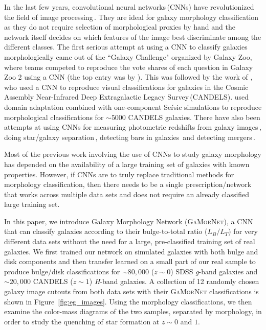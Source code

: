 \documentclass[twocolumn]{aastex63}
\newcommand\gamornet{G\textsc{a}M\textsc{or}N\textsc{et}}
\begin{document}
In the last few years, convolutional neural networks\,(CNNs) have revolutionized the field of image processing\,\citep{dl_1,dl_2}. They are ideal for galaxy morphology classification as they do not require selection of morphological proxies by hand and the network itself decides on which features of the image best discriminate among the different classes. The first serious attempt at using a CNN to classify galaxies morphologically came out of the ``Galaxy Challenge" organized by Galaxy Zoo, where teams competed to reproduce the vote shares of each question in Galaxy Zoo 2 using a CNN (the top entry was by \citealp{dieleman_15}). This was followed by the work of \citet{company_15}, who used a CNN to reproduce visual classifications for galaxies in the Cosmic Assembly Near-Infrared Deep Extragalactic Legacy Survey\,(CANDELS). \citet{tuccillo_18} used domain adaptation combined with one-component Se\'rsic simulations to reproduce morphological classifications for $\sim 5000$ CANDELS galaxies. There have also been attempts at using CNNs for measuring photometric redshifts from galaxy images\,\citep{ml_pz}, doing star/galaxy separation\,\citep{ml_sz}, detecting bars in galaxies\,\citep{ml_bars} and detecting mergers\,\citep{ml_mergers}. 

Most of the previous work involving the use of CNNs to study galaxy morphology has depended on the availability of a large training set of galaxies with known properties. However, if CNNs are to truly replace traditional methods for morphology classification, then there needs to be a single prescription/network that works across multiple data sets and does not require an already classified large training set. 

In this paper, we introduce Galaxy Morphology Network (\gamornet{}), a CNN that can classify galaxies according to their bulge-to-total ratio ($L_B/L_T$) for very different data sets without the need for a large,  pre-classified training set of real galaxies. We first trained our network on simulated galaxies with both bulge and disk components and then transfer learned on a small part of our real sample to produce bulge/disk classifications for $\sim80,000$ ($z \sim 0$) SDSS \textit{g}-band galaxies and $\sim20,000$ CANDELS ($z \sim 1$) \textit{H}-band galaxies. A collection of 12 randomly chosen galaxy image cutouts from both data sets with their \gamornet{} classifications is shown in Figure~\ref{fig:eg_images}. Using the morphology classifications, we then examine the color-mass diagrams of the two samples, separated by morphology, in order to study the quenching of star formation at $z\sim0$ and $1$. 
\end{document}
